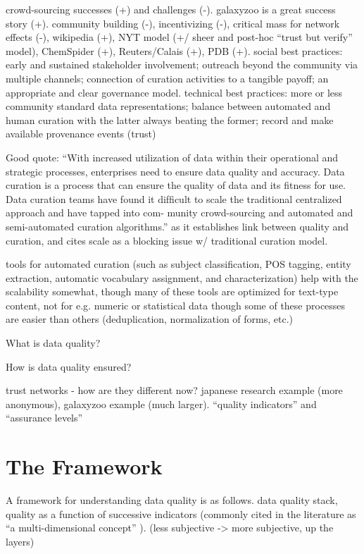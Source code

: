\documentclass{acm_proc_article-sp}
\begin{document}
crowd-sourcing successes (+) and challenges (-). galaxyzoo is a great
success story (+). community building (-), incentivizing (-), critical
mass for network effects (-), wikipedia (+), NYT model (+/ sheer and
post-hoc ``trust but verify'' model), ChemSpider (+), Reuters/Calais
(+), PDB (+).  social best practices\cite{curry:community}: early and
sustained stakeholder involvement; outreach beyond the community via
multiple channels; connection of curation activities to a tangible
payoff; an appropriate and clear governance model. technical best
practices: more or less community standard data representations;
balance between automated and human curation with the latter always
beating the former; record and make available provenance events
(trust)

Good quote: ``With increased utilization of data within their
operational and strategic processes, enterprises need to ensure data
quality and accuracy. Data curation is a process that can ensure the
quality of data and its ﬁtness for use. Data curation teams have found
it difﬁcult to scale the traditional centralized approach and have
tapped into com- munity crowd-sourcing and automated and
semi-automated curation algorithms.''\cite{curry:community} as it
establishes link between quality and curation, and cites scale as a
blocking issue w/ traditional curation model.

tools for automated curation (such as subject classification, POS
tagging, entity extraction, automatic vocabulary assignment, and
characterization) help with the scalability somewhat, though many of
these tools are optimized for text-type content, not for e.g. numeric
or statistical data though some of these processes are easier than
others (deduplication, normalization of forms, etc.)

What is data quality?

How is data quality ensured?

trust networks - how are they different now? japanese research example (more
anonymous), galaxyzoo example (much larger). ``quality indicators'' and
``assurance levels''

\section{The Framework}
A framework for understanding data quality is as follows.  data
quality stack, quality as a function of successive indicators
(commonly cited in the literature as ``a multi-dimensional concept''
\cite{knight:quality}). (less subjective -> more subjective, up the
layers)
\end{document}
